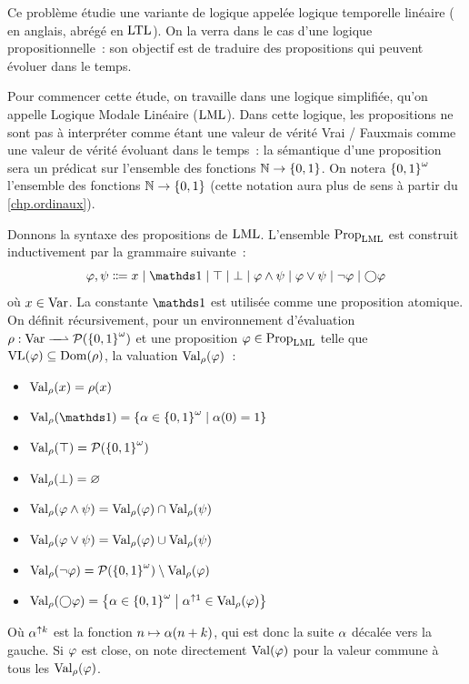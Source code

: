 \clearpage

\begin{problem}
  Ce problème étudie une variante de logique appelée logique temporelle linéaire
  ( en anglais, abrégé en $\operatorname{LTL}$).
  On la verra dans le cas d'une logique propositionnelle~: son objectif est de
  traduire des propositions qui peuvent évoluer dans le temps.


  Pour commencer cette étude, on travaille dans une logique simplifiée, qu'on
  appelle Logique Modale Linéaire ($\operatorname{LML}$). Dans cette logique, les propositions
  ne sont pas à interpréter comme étant une valeur de vérité
  \og Vrai\fg{} / \og Faux\fg mais comme une valeur de vérité évoluant dans le
  temps~: la sémantique d'une proposition sera un prédicat sur l'ensemble des
  fonctions $\mathbb N \to \{0,1\}$.
  On notera ${\{0,1\}}^{\omega}$ l'ensemble des fonctions $\mathbb N \to \{0,1\}$ (cette notation
  aura plus de sens à partir du \cref{chp.ordinaux}).

  Donnons la syntaxe des propositions de $\operatorname{LML}$. L'ensemble $\operatorname{Prop}_{\operatorname{LML}}$ est
  construit inductivement par la grammaire suivante~:
  \[\varFF,\varFP\inddefeq x \mid \vara \mid \top\mid \bot \mid \varFF\land
  \varFP \mid \varFF\lor \varFP \mid \lnot \varFF\mid \modNext\varFF\]
  où $x \in \operatorname{Var}$. La constante $\vara$ est utilisée comme une proposition
  atomique. On définit récursivement, pour un environnement d'évaluation
  $\makeFunNamePartial{\env}{\Var}{\powerset(\infWd)}$ et une proposition
  $\varphi\in\operatorname{Prop}_{\operatorname{LML}}$ telle que $\operatorname{VL}(\varphi) \subseteq \operatorname{Dom}(\rho)$, la
  valuation $\operatorname{Val}_{\rho}(\varphi)$~:
  \begin{itemize}
  \item $\operatorname{Val}_{\rho}(x) = \rho(x)$
  \item $\ValE(\vara) = \compr{\varstr \in \infWd}{\varstr(0) = 1}$
  \item $\operatorname{Val}_{\rho}(\top) = \mathcal{P}({\{0,1\}}^{\omega})$
  \item $\operatorname{Val}_{\rho}(\bot) = \varnothing$
  \item $\operatorname{Val}_{\rho}(\varphi \land \psi) = \operatorname{Val}_{\rho}(\varphi) \cap \operatorname{Val}_{\rho}(\psi)$
  \item $\operatorname{Val}_{\rho}(\varphi \lor  \psi) = \operatorname{Val}_{\rho}(\varphi) \cup \operatorname{Val}_{\rho}(\psi)$
  \item $\operatorname{Val}_{\rho}(\lnot\varphi) = \mathcal{P}({\{0,1\}}^{\omega})\setminus \operatorname{Val}_{\rho}(\varphi)$
  \item $\operatorname{Val}_{\rho}(\mathbin{\bigcirc}\varphi)=
    \left\{ \alpha\in{\{0,1\}}^{\omega} \;\middle\vert\; \alpha^{\uparrow 1}\in\operatorname{Val}_{\rho}(\varphi) \right\}$
  \end{itemize}
  Où $\alpha^{\uparrow k}$ est la fonction $n \mapsto \alpha(n+k)$, qui est
  donc la suite $\alpha$ décalée vers la gauche.
  Si $\varphi$ est close, on note directement
  $\operatorname{Val}(\varphi)$ pour la valeur commune à tous les $\operatorname{Val}_{\rho}(\varphi)$.


\end{problem}
